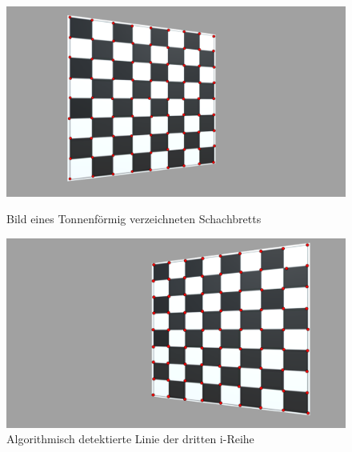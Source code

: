 \begin{figure}[!htb]
	\includegraphics[width=\linewidth]{images/ChessBoardLeft.png}
	\caption{Bild eines Tonnenförmig verzeichneten Schachbretts}
	\label{fig:ChessBoardLeft}
	\endminipage\hfill
	\includegraphics[width=\linewidth]{images/ChessBoardRight.png}
	\caption{Algorithmisch detektierte Linie der dritten i-Reihe}
	\label{fig:ChessBoardRight}
	\endminipage\hfill
\end{figure}


